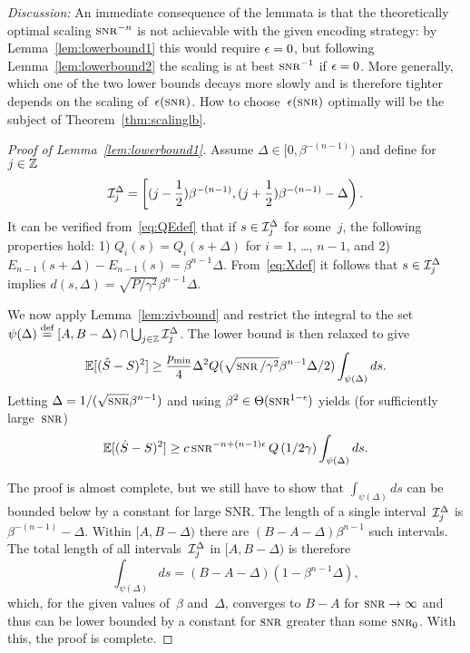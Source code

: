 \emph{Discussion:} An immediate consequence of the lemmata is that the
theoretically optimal scaling $\snr^{-n}$ is not achievable with the given
encoding strategy: by Lemma~\ref{lem:lowerbound1} this would require $\epsilon = 0$,
but following Lemma~\ref{lem:lowerbound2} the scaling is at best $\snr^{-1}$ if
$\epsilon = 0 $.  More generally, which one of the two lower bounds decays more slowly
and is therefore tighter depends on the scaling of~$\e(\snr)$. How to
choose~$\e(\snr)$ optimally will be the subject of Theorem~\ref{thm:scalinglb}.

\begin{proof}[Proof of Lemma~\ref{lem:lowerbound1}]
  Assume $\Delta \in [0, \beta^{-(n-1)})$ and define for $j \in \mathbb{Z}$
  \[ \mathcal{I}_j^\Delta = \left[ (j - \frac12 )\beta^{-(n-1)}, 
    (j + \frac12 ) \beta^{-(n-1)} - \Delta \right).\]
  It can be verified from~\eqref{eq:QEdef} that if $s \in \mathcal{I}_j^\Delta$ for
  some~$j$, the following properties hold: 1) $Q_i(s) = Q_i(s+\Delta)$ for
  $i=1$, \dots, $n-1$, and 2) $E_{n-1}(s+\Delta) - E_{n-1}(s) =
  \beta^{n-1}\Delta$.  From~\eqref{eq:Xdef} it follows that
  $s \in \mathcal{I}_j^\Delta$ implies $d(s, \Delta) = \sqrt{P/\gamma^2} \beta^{n-1}\Delta$.

  We now apply Lemma~\ref{lem:zivbound} and restrict the integral to the
  set~$\psi(\Delta) \stackrel{\text{def}}{=} [A,B-\Delta) \cap \bigcup_{j\in\mathbb{Z}} \mathcal{I}_j^\Delta$. The
  lower bound is then relaxed to give
  \begin{equation*}
    \mse \ge \frac{\pmin}{4} \Delta^2 Q(\sqrt{\snr/\gamma^2} \beta^{n-1}
    \Delta/2) \int_{\psi(\Delta)} ds.
  \end{equation*}
  Letting $\Delta = 1/(\sqrt{\snr}\beta^{n-1})$ and using $\beta^2 \in
  \Theta(\snr^{1-\e})$ yields (for sufficiently large~$\snr$)
  \begin{equation*}
    \mse \ge c \snr^{-n+(n-1)\e} Q\left(1/2\gamma\right)
    \int_{\psi(\Delta)} ds.
  \end{equation*}

  The proof is almost complete, but we still have to show that
  $\int_{\psi(\Delta)}ds$ can be bounded below by a constant for large SNR. The
  length of a single interval~$\mathcal{I}_j^\Delta$ is $\beta^{-(n-1)} - \Delta$. Within
  $[A,B-\Delta)$ there are $(B-A-\Delta)\beta^{n-1}$ such
  intervals. The total length of all intervals~$\mathcal{I}_j^\Delta$ in $[A, B-\Delta)$
  is therefore
  \[ \int_{\psi(\Delta)} ds = (B-A-\Delta)
  (1 - \beta^{n-1}\Delta), \]
  which, for the given values of~$\beta$ and~$\Delta$, 
  converges to $B-A$ for $\snr \ra \infty$ and thus can be lower bounded by a
  constant for $\snr$ greater than some $\snr_0$. With this, the proof is
  complete.
\end{proof}

